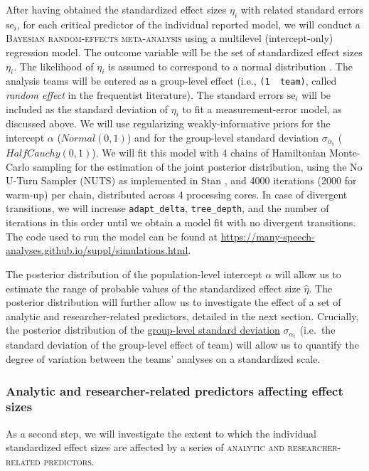 \documentclass[Review,times,sageh]{sagej}
\begin{document}
After having obtained the standardized effect sizes \(\eta_i\) with
related standard errors \(\text{se}_i\), for each critical predictor of
the individual reported model, we will conduct a
\textsc{Bayesian random-effects meta-analysis} using a multilevel
(intercept-only) regression model. The outcome variable will be the set
of standardized effect sizes \(\eta_i\). The likelihood of \(\eta_i\) is
assumed to correspond to a normal distribution \citep{knight2000}. The
analysis teams will be entered as a group-level effect (i.e.,
\texttt{(1\ \textbar{}\ team)}, called \emph{random effect} in the
frequentist literature). The standard errors \(\text{se}_i\) will be
included as the standard deviation of \(\eta_i\) to fit a
measurement-error model, as discussed above. We will use regularizing
weakly-informative priors for the intercept \(\alpha\)
(\(Normal(0, 1)\)) and for the group-level standard deviation
\(\sigma_{\alpha_{\text{t}}}\) (\(HalfCauchy(0, 1)\)). We will fit this
model with 4 chains of Hamiltonian Monte-Carlo sampling for the
estimation of the joint posterior distribution, using the No U-Turn
Sampler (NUTS) as implemented in Stan \citep{stan2021}, and 4000
iterations (2000 for warm-up) per chain, distributed across 4 processing
cores. In case of divergent transitions, we will increase
\texttt{adapt\_delta}, \texttt{tree\_depth}, and the number of
iterations in this order until we obtain a model fit with no divergent
transitions. The code used to run the model can be found at
\url{https://many-speech-analyses.github.io/suppl/simulations.html}.

The posterior distribution of the population-level intercept \(\alpha\)
will allow us to estimate the range of probable values of the
standardized effect size \(\hat{\eta}\). The posterior distribution will
further allow us to investigate the effect of a set of analytic and
researcher-related predictors, detailed in the next section. Crucially,
the posterior distribution of the \href{.smallcaps}{group-level standard
deviation} \(\sigma_{\alpha_{\text{t}}}\) (i.e.~the standard deviation
of the group-level effect of team) will allow us to quantify the degree
of variation between the teams' analyses on a standardized scale.

\subsubsection{Analytic and researcher-related predictors affecting
effect sizes}\label{anares-preds}

As a second step, we will investigate the extent to which the individual
standardized effect sizes are affected by a series of
\textsc{analytic and researcher-related predictors}.
\end{document}
